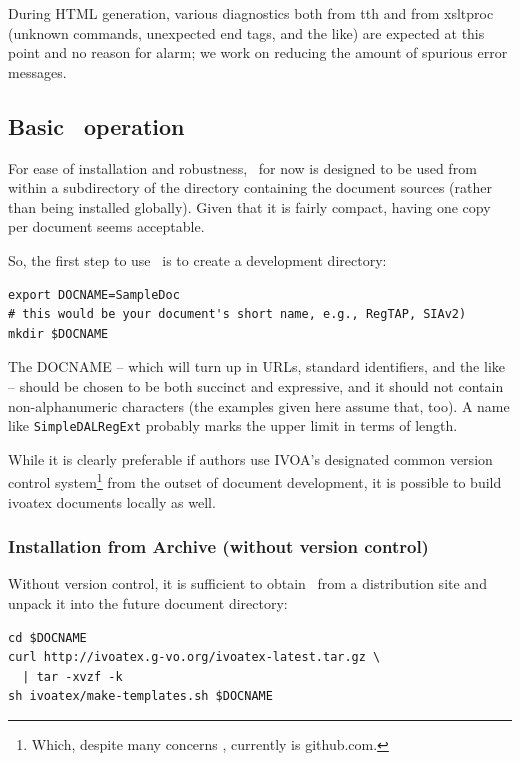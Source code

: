 \documentclass[11pt,a4paper]{ivoa}
\begin{document}
During HTML generation, various diagnostics both 
from tth and from xsltproc (unknown commands,
unexpected end tags, and the like) are
expected at this point and no reason for alarm; we work on reducing the
amount of spurious error messages.

\subsection{Basic \ivoatex~operation}

For ease of installation and robustness, \ivoatex\ for now is designed
to be used from within a subdirectory of the directory containing the
document sources (rather than being installed globally).  Given that
it is fairly compact, having one copy per document seems acceptable.

So, the first step to use \ivoatex\ is to create a development
directory:

\begin{lstlisting}
export DOCNAME=SampleDoc
# this would be your document's short name, e.g., RegTAP, SIAv2)
mkdir $DOCNAME
\end{lstlisting}

The DOCNAME -- which will turn up in URLs, standard identifiers, and the
like -- should be chosen to be both succinct and expressive, and it
should not contain non-alphanumeric characters (the examples given here
assume that, too).  A name
like \texttt{SimpleDALRegExt} probably marks the upper limit in terms of
length.

While it is clearly preferable if authors use IVOA's 
designated common version control system\footnote{Which, despite
many concerns \citep{book:zuboff}, currently is
github.com.} from the outset of
document development, it is possible to build ivoatex documents
locally as well.

\subsubsection{Installation from Archive (without version control)}

Without version control, it is sufficient to obtain \ivoatex\ from a
distribution site and unpack it into the future document directory:

\begin{lstlisting}
cd $DOCNAME
curl http://ivoatex.g-vo.org/ivoatex-latest.tar.gz \
  | tar -xvzf -k
sh ivoatex/make-templates.sh $DOCNAME
\end{lstlisting}
\end{document}
